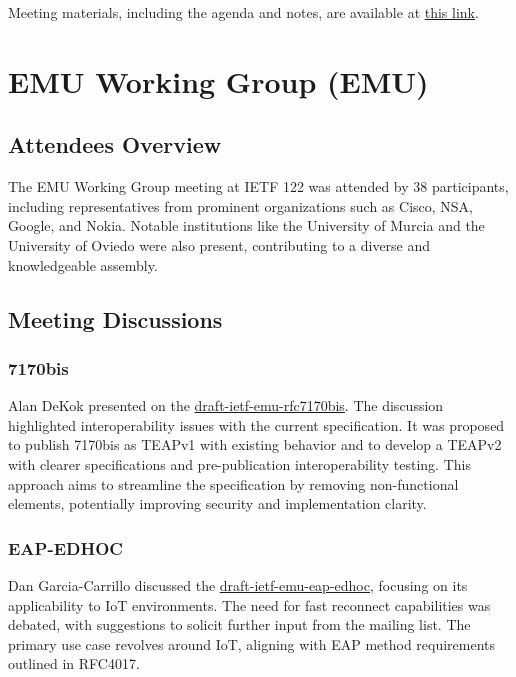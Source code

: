 \documentclass{article}
\begin{document}
Meeting materials, including the agenda and notes, are available at \href{https://notes.ietf.org/notes-ietf-122-emailcore}{this link}.



\newpage

\section{EMU Working Group (EMU)}

\subsection{Attendees Overview}

The EMU Working Group meeting at IETF 122 was attended by 38 participants, including representatives from prominent organizations such as Cisco, NSA, Google, and Nokia. Notable institutions like the University of Murcia and the University of Oviedo were also present, contributing to a diverse and knowledgeable assembly.

\subsection{Meeting Discussions}

\subsubsection{7170bis}

Alan DeKok presented on the \href{https://datatracker.ietf.org/doc/html/draft-ietf-emu-rfc7170bis}{draft-ietf-emu-rfc7170bis}. The discussion highlighted interoperability issues with the current specification. It was proposed to publish 7170bis as TEAPv1 with existing behavior and to develop a TEAPv2 with clearer specifications and pre-publication interoperability testing. This approach aims to streamline the specification by removing non-functional elements, potentially improving security and implementation clarity.

\subsubsection{EAP-EDHOC}

Dan Garcia-Carrillo discussed the \href{https://datatracker.ietf.org/doc/html/draft-ietf-emu-eap-edhoc}{draft-ietf-emu-eap-edhoc}, focusing on its applicability to IoT environments. The need for fast reconnect capabilities was debated, with suggestions to solicit further input from the mailing list. The primary use case revolves around IoT, aligning with EAP method requirements outlined in RFC4017.
\end{document}
